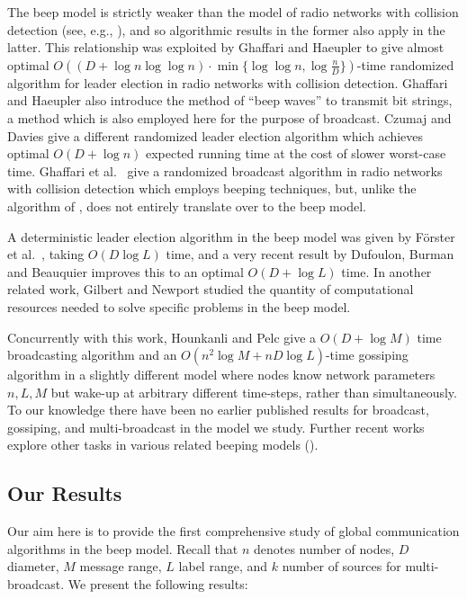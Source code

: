 \documentclass{article}
\begin{document}
The beep model is strictly weaker than the model of radio networks with collision detection (see, e.g., \cite{-Pel07}), and so algorithmic results in the former also apply in the latter. This relationship was exploited by Ghaffari and Haeupler \cite{-GH13} to give almost optimal $O((D+\log n \log\log n) \cdot \min \{\log\log n, \log \frac nD\})$-time randomized algorithm for leader election in radio networks with collision detection. Ghaffari and Haeupler \cite{-GH13} also introduce the method of ``beep waves'' to transmit bit strings, a method which is also employed here for the purpose of broadcast. Czumaj and Davies \cite{-CD16} give a different randomized leader election algorithm which achieves optimal $O(D+\log n)$ expected running time at the cost of slower worst-case time. Ghaffari et al.\ \cite{-GHK13} give a randomized broadcast algorithm in radio networks with collision detection which employs beeping techniques, but, unlike the algorithm of \cite{-GH13}, does not entirely translate over to the beep model.

A deterministic leader election algorithm in the beep model was given by F\"{o}rster et al.\ \cite{-FSW14}, taking $O(D \log L)$ time, and a very recent result by Dufoulon, Burman and Beauquier \cite{-DBB18} improves this to an optimal $O(D+\log L)$ time.   In another related work, Gilbert and Newport \cite{-GN15} studied the quantity of computational resources needed to solve specific problems in the beep model.

Concurrently with this work, Hounkanli and Pelc \cite{-HP15} give a $O(D+\log M)$ time broadcasting algorithm and an $O(n^2\log M + nD \log L)$-time gossiping algorithm in a slightly different model where nodes know network parameters $n, L, M$ but wake-up at arbitrary different time-steps, rather than simultaneously. To our knowledge there have been no earlier published results for broadcast, gossiping, and multi-broadcast in the model we study. Further recent works explore other tasks in various related beeping models (\cite{-BKKPW16,-CMT17,-HMP16,-HP16}).

\subsection{Our Results}

Our aim here is to provide the first comprehensive study of global communication algorithms in the beep model. Recall that $n$ denotes number of nodes, $D$ diameter, $M$ message range, $L$ label range, and $k$ number of sources for multi-broadcast. We present the following results:
\end{document}
